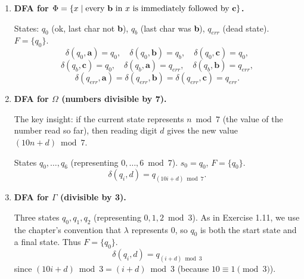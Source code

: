 \documentclass[11pt,openany]{book}
\begin{document}
\begin{enumerate}[{1.}1.]
\item \textbf{DFA for $\Phi = \{x\mid\text{every \textbf{b} in }x\text{ is immediately followed by }\mathbf{c}\}$.}

States: $q_0$ (ok, last char not \textbf{b}), $q_b$ (last char was \textbf{b}), $q_{err}$ (dead state). $F = \{q_0\}$.
\[
\delta(q_0,\mathbf{a})=q_0,\quad\delta(q_0,\mathbf{b})=q_b,\quad\delta(q_0,\mathbf{c})=q_0,
\]
\[
\delta(q_b,\mathbf{c})=q_0,\quad\delta(q_b,\mathbf{a})=q_{err},\quad\delta(q_b,\mathbf{b})=q_{err},
\]
\[
\delta(q_{err},\mathbf{a})=\delta(q_{err},\mathbf{b})=\delta(q_{err},\mathbf{c})=q_{err}.
\]

\begin{center}
\end{center}

\item \textbf{DFA for $\Omega$ (numbers divisible by 7).}

The key insight: if the current state represents $n\bmod 7$ (the value of the number read so far), then reading digit $d$ gives the new value $(10n+d)\bmod 7$.

States $q_0,\ldots,q_6$ (representing $0,\ldots,6\bmod 7$). $s_0=q_0$, $F=\{q_0\}$.
\[
\delta(q_i, d) = q_{(10i+d)\bmod 7}.
\]

\item \textbf{DFA for $\Gamma$ (divisible by 3).}

Three states $q_0,q_1,q_2$ (representing $0,1,2\bmod 3$). As in Exercise 1.11,
we use the chapter's convention that $\lambda$ represents $0$, so $q_0$ is both
the start state and a final state. Thus $F=\{q_0\}$.
\[
\delta(q_i,d) = q_{(i+d)\bmod 3}
\]
since $(10i+d)\bmod 3 = (i+d)\bmod 3$ (because $10\equiv 1\pmod 3$).


\end{enumerate}
\end{document}
